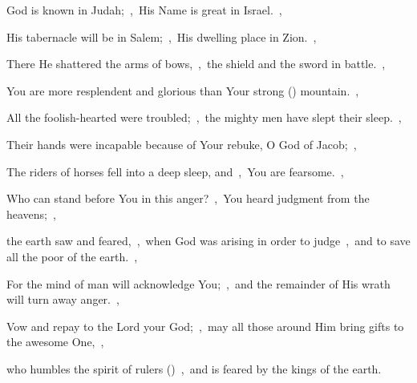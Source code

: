 \documentclass[12pt,twoside,a5paper]{article}
\begin{document}
\begin{normalparskip}
  God is known in Judah;~\sep\ His Name is great in Israel.~\sep


  His tabernacle will be in Salem;~\sep\ His dwelling place in Zion.~\sep

  There He shattered the arms of bows,~\sep\ the shield and the sword in battle.~\sep

  You are more resplendent and glorious than Your strong () mountain.~\sep

  All the foolish-hearted were troubled;~\sep\ the mighty men have slept their sleep.~\sep

  Their hands were incapable because of Your rebuke, O God of Jacob;~\sep

  The riders of horses fell into a deep sleep, and~\sep\ You are fearsome.~\sep

  Who can stand before You in this anger?~\sep\ You heard judgment from the heavens;~\sep

  the earth saw and feared,~\sep\ when God was arising in order to judge~\sep\ and to save all the poor of the earth.~\sep

  For the mind of man will acknowledge You;~\sep\ and the remainder of His wrath will turn away anger.~\sep

  Vow and repay to the Lord your God;~\sep\ may all those around Him bring gifts to the awesome One,~\sep

  who humbles the spirit of rulers ()~\sep\ and is feared by the kings of the earth.
\end{normalparskip}

\end{document}
